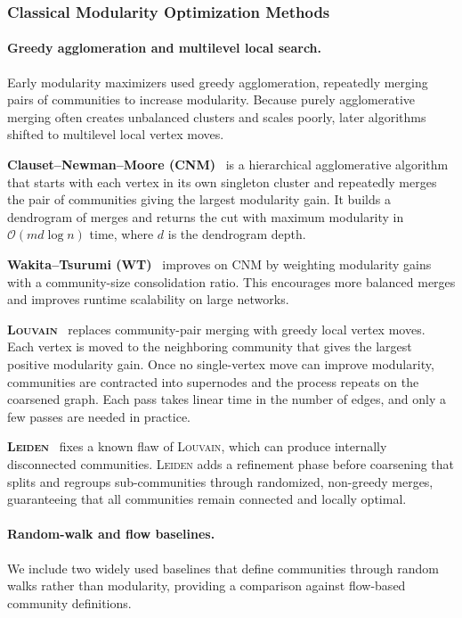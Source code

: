 \documentclass[11pt,a4paper]{article}
\begin{document}
\subsubsection{Classical Modularity Optimization Methods}

\paragraph*{\textbf{Greedy agglomeration and multilevel local search.}}
Early modularity maximizers used greedy agglomeration, repeatedly merging pairs of communities to increase modularity. Because purely agglomerative merging often creates unbalanced clusters and scales poorly, later algorithms shifted to multilevel local vertex moves.

\textbf{Clauset--Newman--Moore (\textsc{CNM})}~\cite{cnm2004} is a hierarchical agglomerative algorithm that starts with each vertex in its own singleton cluster and repeatedly merges the pair of communities giving the largest modularity gain. It builds a dendrogram of merges and returns the cut with maximum modularity in $\mathcal{O}(md \log n)$ time, where $d$ is the dendrogram depth.

\textbf{Wakita--Tsurumi (\textsc{WT})}~\cite{wt2007} improves on \textsc{CNM} by weighting modularity gains with a community-size consolidation ratio. This encourages more balanced merges and improves runtime scalability on large networks.

\textbf{\textsc{Louvain}}~\cite{louvain2008} replaces community-pair merging with greedy local vertex moves. Each vertex is moved to the neighboring community that gives the largest positive modularity gain. Once no single-vertex move can improve modularity, communities are contracted into supernodes and the process repeats on the coarsened graph. Each pass takes linear time in the number of edges, and only a few passes are needed in practice.

\textbf{\textsc{Leiden}}~\cite{leiden2019} fixes a known flaw of \textsc{Louvain}, which can produce internally disconnected communities. \textsc{Leiden} adds a refinement phase before coarsening that splits and regroups sub-communities through randomized, non-greedy merges, guaranteeing that all communities remain connected and locally optimal.

\paragraph*{\textbf{Random-walk and flow baselines.}}
We include two widely used baselines that define communities through random walks rather than modularity, providing a comparison against flow-based community definitions.
\end{document}
